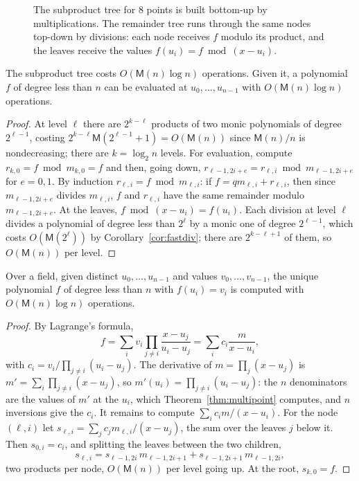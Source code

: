\begin{figure}[ht]
\centering
{}
\caption{The subproduct tree for $8$ points is built bottom-up by multiplications. The remainder tree runs through the same nodes top-down by divisions: each node receives $f$ modulo its product, and the leaves receive the values $f(u_i)=f\bmod(x-u_i)$.}
\label{fig:subproduct}
\end{figure}

\begin{theorem}\label{thm:multipoint}
The subproduct tree costs $O(\mathsf M(n)\log n)$ operations. Given it, a polynomial $f$ of degree less than $n$ can be evaluated at $u_0,\dots,u_{n-1}$ with $O(\mathsf M(n)\log n)$ operations.
\end{theorem}
\begin{proof}
At level $\ell$ there are $2^{k-\ell}$ products of two monic polynomials of degree $2^{\ell-1}$, costing $2^{k-\ell}\mathsf M(2^{\ell-1}+1)=O(\mathsf M(n))$ since $\mathsf M(n)/n$ is nondecreasing; there are $k=\log_2n$ levels. For evaluation, compute $r_{k,0}=f\bmod m_{k,0}=f$ and then, going down, $r_{\ell-1,2i+e}=r_{\ell,i}\bmod m_{\ell-1,2i+e}$ for $e=0,1$. By induction
$r_{\ell,i}=f\bmod m_{\ell,i}$: if $f=qm_{\ell,i}+r_{\ell,i}$, then since $m_{\ell-1,2i+e}$ divides $m_{\ell,i}$, $f$ and $r_{\ell,i}$ have the same remainder modulo $m_{\ell-1,2i+e}$. At the leaves, $f\bmod(x-u_i)=f(u_i)$. Each division at level $\ell$ divides a polynomial of degree less than $2^\ell$ by a monic one of degree $2^{\ell-1}$, which costs $O(\mathsf M(2^\ell))$ by Corollary~\ref{cor:fastdiv}; there are $2^{k-\ell+1}$ of them, so $O(\mathsf M(n))$ per level.
\end{proof}

\begin{theorem}\label{thm:interpolation}
Over a field, given distinct $u_0,\dots,u_{n-1}$ and values $v_0,\dots,v_{n-1}$, the unique polynomial $f$ of degree less than $n$ with $f(u_i)=v_i$ is computed with $O(\mathsf M(n)\log n)$ operations.
\end{theorem}
\begin{proof}
By Lagrange's formula,
\[
f=\sum_iv_i\prod_{j\ne i}\frac{x-u_j}{u_i-u_j}=\sum_ic_i\frac m{x-u_i},
\]
with $c_i=v_i/\prod_{j\ne i}(u_i-u_j)$. The derivative of $m=\prod_j(x-u_j)$ is $m'=\sum_i\prod_{j\ne i}(x-u_j)$, so $m'(u_i)=\prod_{j\ne i}(u_i-u_j)$: the $n$ denominators are the values of $m'$ at the $u_i$, which Theorem~\ref{thm:multipoint} computes, and $n$ inversions give the $c_i$.
It remains to compute $\sum_ic_im/(x-u_i)$. For the node $(\ell,i)$ let $s_{\ell,i}=\sum_jc_jm_{\ell,i}/(x-u_j)$, the sum over the leaves $j$ below it. Then $s_{0,i}=c_i$, and splitting the leaves between the two children,
\[
s_{\ell,i}=s_{\ell-1,2i}\,m_{\ell-1,2i+1}+s_{\ell-1,2i+1}\,m_{\ell-1,2i},
\]
two products per node, $O(\mathsf M(n))$ per level going up. At the root, $s_{k,0}=f$.
\end{proof}


